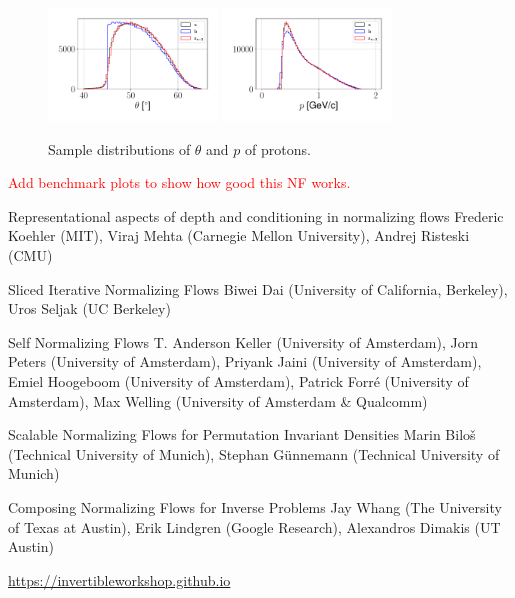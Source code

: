 \begin{figure}[htb]
\centering
\includegraphics[width = 0.4\textwidth]{Chapters/Ch3-Simulations/normalizing_flows/pics/MeetingFigures/Sangbaek/theta.pdf}
\includegraphics[width = 0.4\textwidth]{Chapters/Ch3-Simulations/normalizing_flows/pics/MeetingFigures/Sangbaek/momentum.pdf}
\label{fig: jul8_direct2}
\caption[Placeholder Short text]{Sample distributions of $\theta$ and $p$ of protons.}
\end{figure}

\textcolor{red}{Add benchmark plots to show how good this NF works.}


Representational aspects of depth and conditioning in normalizing flows
Frederic Koehler (MIT), Viraj Mehta (Carnegie Mellon University), Andrej Risteski (CMU)

Sliced Iterative Normalizing Flows
Biwei Dai (University of California, Berkeley), Uros Seljak (UC Berkeley)

Self Normalizing Flows
T. Anderson Keller (University of Amsterdam), Jorn Peters (University of Amsterdam), Priyank Jaini (University of Amsterdam), Emiel Hoogeboom (University of Amsterdam), Patrick Forré (University of Amsterdam), Max Welling (University of Amsterdam \& Qualcomm)

Scalable Normalizing Flows for Permutation Invariant Densities
Marin Biloš (Technical University of Munich), Stephan Günnemann (Technical University of Munich)

Composing Normalizing Flows for Inverse Problems
Jay Whang (The University of Texas at Austin), Erik Lindgren (Google Research), Alexandros Dimakis (UT Austin)

\url{https://invertibleworkshop.github.io}


